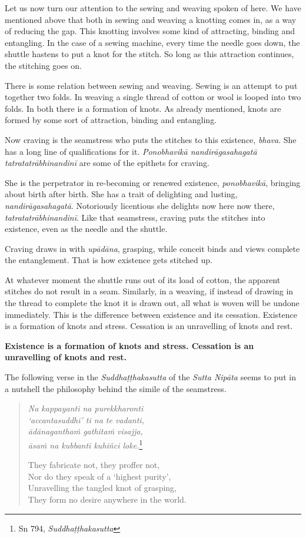 Let us now turn our attention to the sewing and weaving spoken of here. We have mentioned above that both in sewing and weaving a knotting comes in, as a way of reducing the gap. This knotting involves some kind of attracting, binding and entangling. In the case of a sewing machine, every time the needle goes down, the shuttle hastens to put a knot for the stitch. So long as this attraction continues, the stitching goes on.

There is some relation between sewing and weaving. Sewing is an attempt to put together two folds. In weaving a single thread of cotton or wool is looped into two folds. In both there is a formation of knots. As already mentioned, knots are formed by some sort of attraction, binding and entangling.

Now craving is the seamstress who puts the stitches to this existence, \emph{bhava}. She has a long line of qualifications for it. \emph{Ponobhavikā nandirāgasahagatā tatratatrābhinandinī} are some of the epithets for craving.

She is the perpetrator in re-becoming or renewed existence, \emph{ponobhavikā}, bringing about birth after birth. She has a trait of delighting and lusting, \emph{nandirāgasahagatā}. Notoriously licentious she delights now here now there, \emph{tatratatrābhinandinī}. Like that seamstress, craving puts the stitches into existence, even as the needle and the shuttle.

Craving draws in with \emph{upādāna}, grasping, while conceit binds and views complete the entanglement. That is how existence gets stitched up.

At whatever moment the shuttle runs out of its load of cotton, the apparent stitches do not result in a seam. Similarly, in a weaving, if instead of drawing in the thread to complete the knot it is drawn out, all what is woven will be undone immediately. This is the difference between existence and its cessation. Existence is a formation of knots and stress. Cessation is an unravelling of knots and rest.

\textbf{Existence is a formation of knots and stress. Cessation is an unravelling of knots and rest.}

The following verse in the \emph{Suddhaṭṭhakasutta} of the \emph{Sutta Nipāta} seems to put in a nutshell the philosophy behind the simile of the seamstress.

\begin{quote}
\emph{Na kappayanti na purekkharonti}\\
\emph{`accantasuddhī' ti na te vadanti,}\\
\emph{ādānaganthaṁ gathitaṁ visajja,}\\
\emph{āsaṁ na kubbanti kuhiñci loke.}\footnote{Sn 794, \emph{Suddhaṭṭhakasutta}}

They fabricate not, they proffer not,\\
Nor do they speak of a `highest purity',\\
Unravelling the tangled knot of grasping,\\
They form no desire anywhere in the world.
\end{quote}

